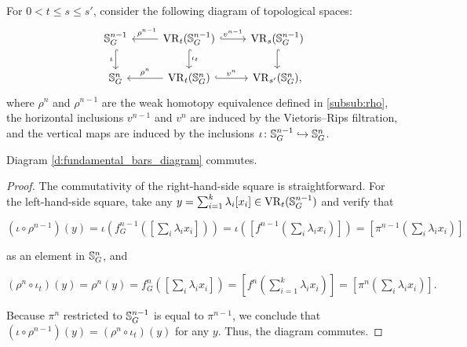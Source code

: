 \subsubsection{}

For $0<t\leq s \leq s'$, consider the following diagram of topological spaces:
\begin{equation}\label{d:fundamental_bars_diagram}
	\begin{tikzcd}
		\bS^{n-1}_G
		\ar[d, hook,"{\iota}" left]
		&
		\VR_t(\bS^{n-1}_G)
		\ar[d, hook,"\iota_t"]
		\ar[l, "\ \rho^{n-1}" above]
		\ar[r, hook, "v^{n-1}"]
		&
		\VR_{s}(\bS^{n-1}_G)
		\ar[d, hook]
		\\
		\bS^{n}_G
		&
		\VR_t(\bS^{n}_G)
		\ar[l, "\rho^n" above]
		\ar[r, hook, "v^{n}"]
		&
		\VR_{s'}(\bS^{n}_G),
	\end{tikzcd}
\end{equation}
where $\rho^n$ and $\rho^{n-1}$ are the weak homotopy equivalence defined in \cref{subsub:rho}, the horizontal inclusions $v^{n-1}$ and $v^n$ are induced by the Vietoris--Rips filtration, and the vertical maps are induced by the inclusions $\iota \colon \mathbb{S}^{n-1}_G \hookrightarrow \mathbb{S}^{n}_G$.

\medskip\lemma
Diagram \eqref{d:fundamental_bars_diagram} commutes.

\begin{proof}
	The commutativity of the right-hand-side square is straightforward.
	For the left-hand-side square, take any $y = \sum_{i=1}^k \lambda_i [x_i] \in \operatorname{VR}_t(\mathbb{S}^{n-1}_G)$ and verify that
	\begin{center}
		$(\iota \circ \rho^{n-1})(y)
		=\iota(f^{n-1}_G([\sum_i \lambda_i x_i]))
		=\iota([f^{n-1}(\sum_i \lambda_i x_i)])
		=[\pi^{n-1}(\sum_i \lambda_i x_i)]
		$
	\end{center}
	as an element in $\mathbb{S}^n_G$, and
	\begin{center}
		$(\rho^{n} \circ \iota_t)(y) = \rho^{n}(y) = f^{n}_G([\sum_i \lambda_i x_i]) = [f^{n}(\sum_{i=1}^k \lambda_i x_i)] = [\pi^{n}(\sum_i \lambda_i x_i)].
		$
	\end{center}
	Because $\pi^{n}$ restricted to $\mathbb{S}^{n-1}_G$ is equal to $\pi^{n-1}$, we conclude that $(\iota \circ \rho^{n-1})(y) = (\rho^n \circ \iota_t)(y)$ for any $y$.
	Thus, the diagram commutes.
\end{proof}

